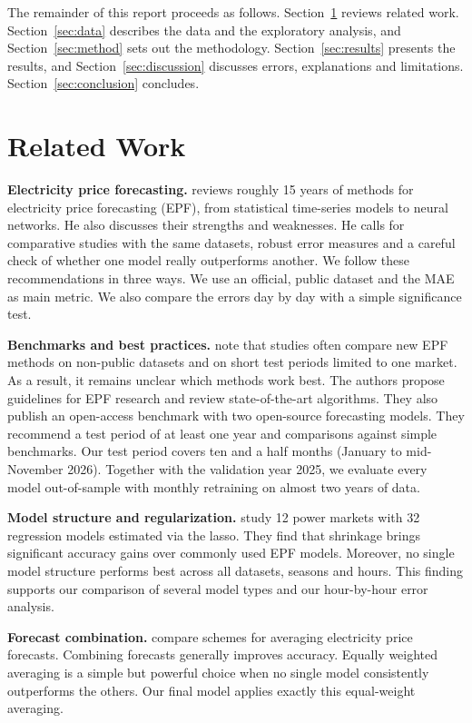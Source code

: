 \documentclass[12pt,oneside]{article}
\begin{document}
The remainder of this report proceeds as follows. Section~\ref{sec:related} reviews related work. Section~\ref{sec:data} describes the data and the exploratory analysis, and Section~\ref{sec:method} sets out the methodology. Section~\ref{sec:results} presents the results, and Section~\ref{sec:discussion} discusses errors, explanations and limitations. Section~\ref{sec:conclusion} concludes.

\section{Related Work} \label{sec:related}

\textbf{Electricity price forecasting.} \citet{weron2014} reviews roughly 15 years of methods for electricity price forecasting (EPF), from statistical time-series models to neural networks. He also discusses their strengths and weaknesses. He calls for comparative studies with the same datasets, robust error measures and a careful check of whether one model really outperforms another. We follow these recommendations in three ways. We use an official, public dataset and the MAE as main metric. We also compare the errors day by day with a simple significance test.

\textbf{Benchmarks and best practices.} \citet{lago2021} note that studies often compare new EPF methods on non-public datasets and on short test periods limited to one market. As a result, it remains unclear which methods work best. The authors propose guidelines for EPF research and review state-of-the-art algorithms. They also publish an open-access benchmark with two open-source forecasting models. They recommend a test period of at least one year and comparisons against simple benchmarks. Our test period covers ten and a half months (January to mid-November 2026). Together with the validation year 2025, we evaluate every model out-of-sample with monthly retraining on almost two years of data.

\textbf{Model structure and regularization.} \citet{ziel2018} study 12 power markets with 32 regression models estimated via the lasso. They find that shrinkage brings significant accuracy gains over commonly used EPF models. Moreover, no single model structure performs best across all datasets, seasons and hours. This finding supports our comparison of several model types and our hour-by-hour error analysis.

\textbf{Forecast combination.} \citet{nowotarski2014} compare schemes for averaging electricity price forecasts. Combining forecasts generally improves accuracy. Equally weighted averaging is a simple but powerful choice when no single model consistently outperforms the others. Our final model applies exactly this equal-weight averaging.
\end{document}
